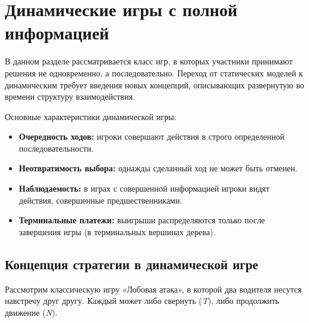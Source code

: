 \section{Динамические игры с полной информацией}

В данном разделе рассматривается класс игр, в которых участники принимают решения не одновременно, а последовательно. Переход от статических моделей к динамическим требует введения новых концепций, описывающих развернутую во времени структуру взаимодействия.

Основные характеристики динамической игры:
\begin{itemize}
    \item \textbf{Очередность ходов:} игроки совершают действия в строго определенной последовательности.
    \item \textbf{Неотвратимость выбора:} однажды сделанный ход не может быть отменен.
    \item \textbf{Наблюдаемость:} в играх с совершенной информацией игроки видят действия, совершенные предшественниками.
    \item \textbf{Терминальные платежи:} выигрыши распределяются только после завершения игры (в терминальных вершинах дерева).
\end{itemize}

\subsection{Концепция стратегии в динамической игре}

Рассмотрим классическую игру «Лобовая атака», в которой два водителя несутся навстречу друг другу. Каждый может либо свернуть (\textit{T}), либо продолжить движение (\textit{N}). 

